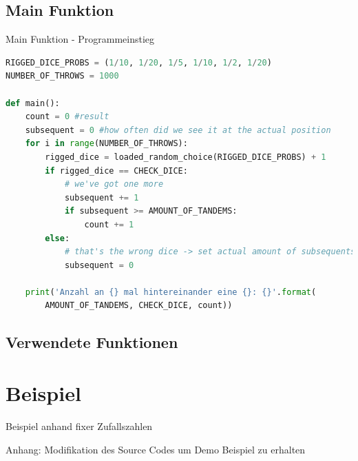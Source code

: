 \subsection{Main Funktion}
\begin{frame}[fragile]{Main Funktion - Programmeinstieg}
  \begin{lstlisting}[language=python]
RIGGED_DICE_PROBS = (1/10, 1/20, 1/5, 1/10, 1/2, 1/20)
NUMBER_OF_THROWS = 1000

def main():
    count = 0 #result
    subsequent = 0 #how often did we see it at the actual position
    for i in range(NUMBER_OF_THROWS):
        rigged_dice = loaded_random_choice(RIGGED_DICE_PROBS) + 1
        if rigged_dice == CHECK_DICE:
            # we've got one more
            subsequent += 1
            if subsequent >= AMOUNT_OF_TANDEMS:
                count += 1
        else:
            # that's the wrong dice -> set actual amount of subsequents back to zero
            subsequent = 0
            
    print('Anzahl an {} mal hintereinander eine {}: {}'.format(
        AMOUNT_OF_TANDEMS, CHECK_DICE, count))
\end{lstlisting}
\logopythonbottom
\end{frame}

\subsection{Verwendete Funktionen}

%
%

\section{Beispiel}
\begin{frame}[fragile]{Beispiel anhand fixer Zufallszahlen}
\end{frame}

\begin{frame}[fragile]{Anhang: Modifikation des Source Codes um Demo Beispiel zu erhalten}
  \begin{lstlisting}[language=python]
  \end{lstlisting}
\logopythonbottom
\end{frame}

